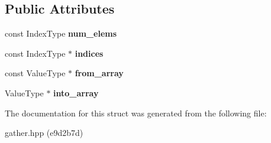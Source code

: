 \subsection*{Public Attributes}
\begin{DoxyCompactItemize}
\item 
\mbox{\label{structschwz_1_1Gather_a9c16149747d5a4c77c061d750a27faf2}} 
const Index\+Type {\bfseries num\+\_\+elems}
\item 
\mbox{\label{structschwz_1_1Gather_a8adc05f74bac862e80eae9e5bcd6918d}} 
const Index\+Type $\ast$ {\bfseries indices}
\item 
\mbox{\label{structschwz_1_1Gather_ae45f6ecca9f53252e804c6de1b96f4dd}} 
const Value\+Type $\ast$ {\bfseries from\+\_\+array}
\item 
\mbox{\label{structschwz_1_1Gather_a2edcfcb6bb277db9273a3865a4c2f017}} 
Value\+Type $\ast$ {\bfseries into\+\_\+array}
\end{DoxyCompactItemize}


The documentation for this struct was generated from the following file\+:\begin{DoxyCompactItemize}
\item 
gather.\+hpp (e9d2b7d)\end{DoxyCompactItemize}
